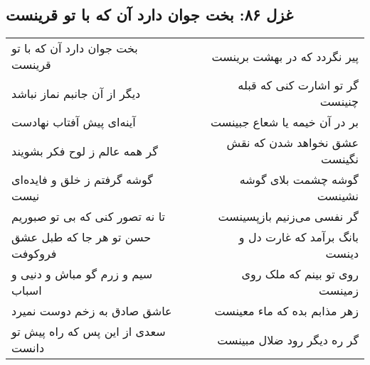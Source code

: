 \begin{center}
\section*{غزل ۸۶: بخت جوان دارد آن که با تو قرینست}
\label{sec:086}
\begin{longtable}{l p{0.5cm} r}
بخت جوان دارد آن که با تو قرینست
&&
پیر نگردد که در بهشت برینست
\\
دیگر از آن جانبم نماز نباشد
&&
گر تو اشارت کنی که قبله چنینست
\\
آینه‌ای پیش آفتاب نهادست
&&
بر در آن خیمه یا شعاع جبینست
\\
گر همه عالم ز لوح فکر بشویند
&&
عشق نخواهد شدن که نقش نگینست
\\
گوشه گرفتم ز خلق و فایده‌ای نیست
&&
گوشه چشمت بلای گوشه نشینست
\\
تا نه تصور کنی که بی تو صبوریم
&&
گر نفسی می‌زنیم بازپسینست
\\
حسن تو هر جا که طبل عشق فروکوفت
&&
بانگ برآمد که غارت دل و دینست
\\
سیم و زرم گو مباش و دنیی و اسباب
&&
روی تو بینم که ملک روی زمینست
\\
عاشق صادق به زخم دوست نمیرد
&&
زهر مذابم بده که ماء معینست
\\
سعدی از این پس که راه پیش تو دانست
&&
گر ره دیگر رود ضلال مبینست
\\
\end{longtable}
\end{center}
